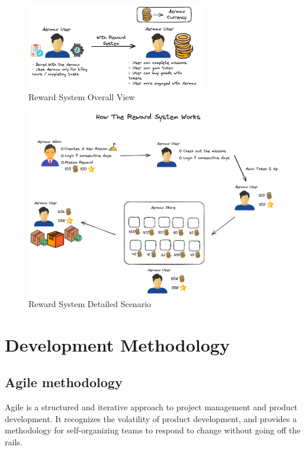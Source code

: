 \begin{figure}[H]
    \centering
    \includegraphics[width=0.7\textwidth]{src/assets/diagrams/rewardexplain.png}
    \caption{Reward System Overall View}
    \label{fig:Reward_System_explain_image}
\end{figure}

\begin{figure}[H]
    \centering
    \includegraphics[width=1\textwidth]{src/assets/diagrams/rewardexplain2.png}
    \caption{Reward System Detailed Scenario}
    \label{fig:Reward_System_detailed_explain_image}
\end{figure}
   
\section{Development Methodology}
\subsection{Agile methodology}
Agile is a structured and iterative approach to project management and product development.
It recognizes the volatility of product development, and provides a methodology for self-organizing teams to respond to change without going off the rails.

